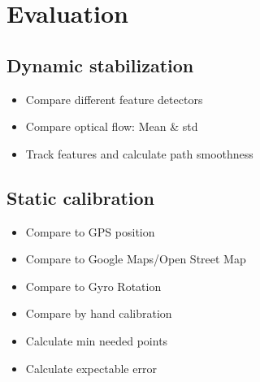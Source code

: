 \section{Evaluation}
\subsection{Dynamic stabilization}
\begin{itemize}
    \item Compare different feature detectors
    \item Compare optical flow: Mean \& std
    \item Track features and calculate path smoothness
\end{itemize}
\subsection{Static calibration}
\begin{itemize}
    \item Compare to GPS position
    \item Compare to Google Maps/Open Street Map
    \item Compare to Gyro Rotation
    \item Compare by hand calibration
    \item Calculate min needed points
    \item Calculate expectable error
\end{itemize}